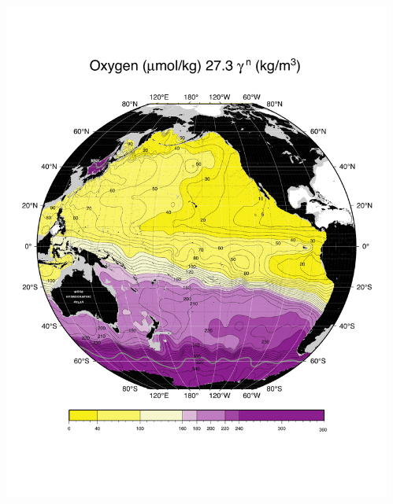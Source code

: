\documentclass{beamer}
\begin{document}
\begin{frame}[plain,t]
\begin{columns}
\begin{column}{0.33\textwidth}
          \includegraphics[width=\textwidth]{oxygen_isopyc_final_pdf/pac2730_oxygen_final.pdf}  
      \end{column}
      \begin{column}{0.33\textwidth}

\end{column}
\end{columns}
\end{frame}
\end{document}
